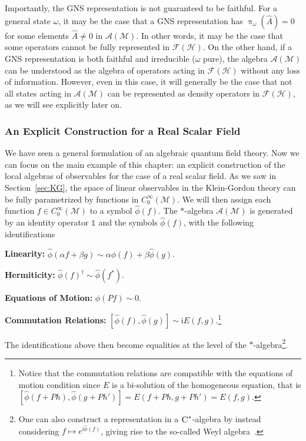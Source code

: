 \documentclass[letterpaper,12pt,titlepage,oneside,final]{book}
\newcommand{\openone}{\mathds{1}}
\newcommand{\M}{\mathcal{M}}
\newcommand{\ii}{\mathrm{i}}
\newcommand{\tc}[1]{\textsc{#1}}
\begin{document}
Importantly, the GNS representation is not guaranteed to be faithful. For a general state $\omega$, it may be the case that a GNS representation has $\uppi_\omega(\hat{A}) = 0$ for some elements $\hat{A}\neq 0$ in $\mathcal{A}(\M)$. In other words, it may be the case that some operators cannot be fully represented in $\mathcal{F}(\mathscr{H})$. On the other hand, if a GNS representation is both faithful and irreducible ($\omega$ pure), the algebra $\mathcal{A}(\M)$ can be understood as the algebra of operators acting in $\mathcal{F}(\mathscr{H})$ without any loss of information. However, even in this case, it will generally be the case that not all states acting in $\mathcal{A}(\M)$ can be represented as density operators in $\mathcal{F}(\mathscr{H})$, as we will see explicitly later on.


\subsubsection*{An Explicit Construction for a Real Scalar Field}

We have seen a general formulation of an algebraic quantum field theory. Now we can focus on the main example of this chapter: an explicit construction of the local algebras of observables for the case of a real scalar field. As we saw in Section~\ref{sec:KG}, the space of linear observables in the Klein-Gordon theory can be fully parametrized by functions in $C^\infty_0(\M)$. We will then assign each function $f\in C_0^\infty(\M)$ to a symbol $\hat{\phi}(f)$. The $\ast$-algebra $\mathcal{A}(\M)$ is generated by an identity operator $\openone$ and the symbols $\hat{\phi}(f)$, with the following identifications

\noindent \textbf{Linearity:} $\hat{\phi}(\alpha f + \beta g) \sim\alpha\hat{\phi}(f) + \beta \hat{\phi}(g)$.

\noindent \textbf{Hermiticity:} $\hat{\phi}(f)^\dagger \sim \hat{\phi}(f^*)$.

\noindent \textbf{Equations of Motion:} $\hat{\phi}(Pf) \sim 0$.

\noindent \textbf{Commutation Relations:} $[\hat{\phi}(f),\hat{\phi}(g)] \sim \ii E(f,g)$.\footnote{Notice that the commutation relations are compatible with the equations of motion condition since $E$ is a bi-solution of the homogeneous equation, that is $[\hat{\phi}(f+Ph),\hat{\phi}(g+Ph')] = E(f+Ph,g+Ph') = E(f,g)$.}

\noindent The identifications above then become equalities at the level of the $\ast$-algebra\footnote{One can also construct a representation in a $\tc{C}^*$-algebra by instead considering $f\mapsto e^{\ii \hat{\phi}(f)}$, giving rise to the so-called Weyl algebra~\cite{kasiaFewsterIntro}.}. 
\end{document}
